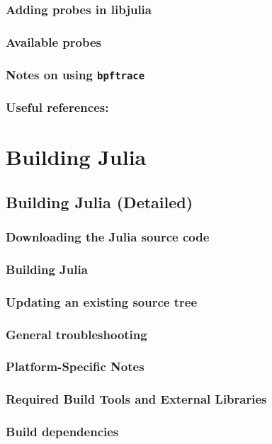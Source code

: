     \subsection{Adding probes in libjulia}
    \subsection{Available probes}
    \subsection{Notes on using \texttt{bpftrace}}
    \subsection{Useful references:}
  \chapter{Building Julia}
    \section{Building Julia (Detailed)}
    \subsection{Downloading the Julia source code}
    \subsection{Building Julia}
    \subsection{Updating an existing source tree}
    \subsection{General troubleshooting}
    \subsection{Platform-Specific Notes}
    \subsection{Required Build Tools and External Libraries}
    \subsection{Build dependencies}
